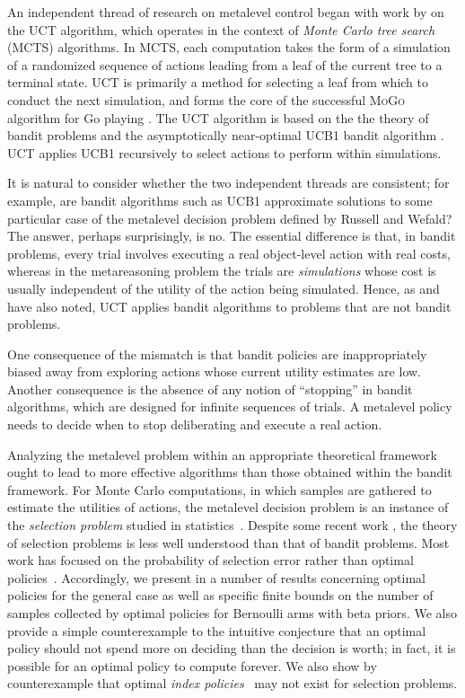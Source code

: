 An independent thread of research on metalevel control began with work
by \citet{Kocsis+Szepesvari:2006} on the UCT algorithm, which operates
in the context of {\em Monte Carlo tree search} (MCTS) algorithms.
In MCTS, each computation takes the form
of a simulation of a randomized sequence of actions leading from a leaf of the
current tree to a terminal state. UCT is primarily a method for
selecting a leaf from which to conduct the next simulation, and
forms the core of the successful \textsc{MoGo} algorithm for Go 
playing \citep{Gelly+Silver:2011}.  The UCT algorithm is
based on the the theory of bandit problems \citep{Berry+Fristedt:1985} and the asymptotically near-optimal
UCB1 bandit algorithm \citep{Auer+et+al:2002}. UCT applies
UCB1 recursively to select actions to perform within simulations.

It is natural to consider whether the two independent threads are
consistent; for example, are bandit algorithms such as UCB1
approximate solutions to some particular case of the metalevel
decision problem defined by Russell and Wefald? The answer, perhaps
surprisingly, is no.  The essential difference is that, in bandit
problems, every trial involves executing a real object-level action
with real costs, whereas in the metareasoning problem the trials are
{\em simulations} whose cost is usually independent of the utility of
the action being simulated.  Hence, as \citet{Audibert+al:2010}
and \citet{Bubeck+al:2011} have also noted, UCT applies bandit
algorithms to problems that are not bandit problems.

One consequence of the mismatch is that bandit policies are
inappropriately biased away from exploring actions whose current
utility estimates are low.  Another consequence is the absence of any
notion of ``stopping'' in bandit algorithms, which are designed for
infinite sequences of trials.  A metalevel policy needs to decide
when to stop deliberating and execute a real action.

Analyzing the metalevel problem within an appropriate theoretical
framework ought to lead to more effective algorithms than those
obtained within the bandit framework.  For Monte Carlo computations,
in which samples are gathered to estimate the utilities of actions,
the metalevel decision problem is an instance of the {\em selection
problem} studied in statistics~\citep{Bechhofer:1954,Swisher+et+al:2003}.  Despite
some recent work \citep{Frazier+Powell:2010,TolpinShimony:2012}, the theory of selection
problems is less well understood than that of bandit problems.
Most work has focused on the probability of selection error rather than
optimal policies~\citep{Bubeck+al:2011}.
Accordingly, we present in 
a number of results concerning optimal policies for the general case
as well as specific finite
bounds on the number of samples collected by optimal policies for
Bernoulli arms with beta priors. We also provide a simple
counterexample to the intuitive conjecture that an optimal policy
should not spend more on deciding than the decision is worth; in fact,
it is possible for an optimal policy to compute forever. We also show
by counterexample that optimal {\em index
policies}~\citep{Gittins:1989} may not exist for selection
problems.

